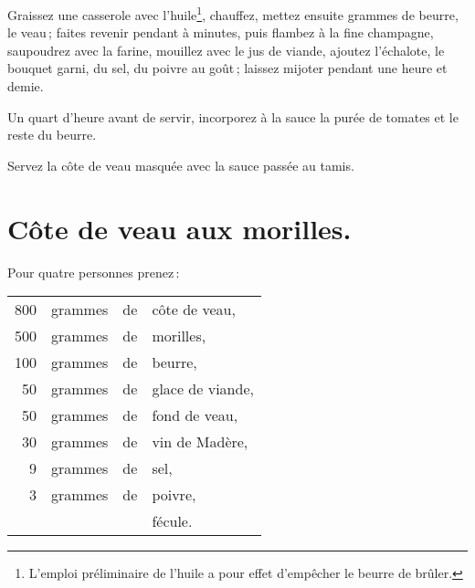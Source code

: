 Graissez une casserole avec l'huile\footnote{L'emploi préliminaire de l'huile
a pour effet d'empêcher le beurre de brûler.}, chauffez, mettez ensuite
{\mmm} grammes de beurre, le veau ; faites revenir pendant {\mmm}
à {\mmm} minutes, puis flambez à la fine champagne, saupoudrez avec la
farine, mouillez avec le jus de viande, ajoutez l'échalote, le bouquet garni,
du sel, du poivre au goût ; laissez mijoter pendant une heure et demie.

Un quart d'heure avant de servir, incorporez à la sauce la purée de tomates et
le reste du beurre.

Servez la côte de veau masquée avec la sauce passée au tamis.

\section*{\centering Côte de veau aux morilles.}
{}

Pour quatre personnes prenez :

\medskip

\footnotesize
\begin{longtable}{rrrp{16em}}
    800 & grammes & de & côte de veau,                                                                    \\
    500 & grammes & de & morilles,                                                                        \\
    100 & grammes & de & beurre,                                                                          \\
     50 & grammes & de & glace de viande,                                                                 \\
     50 & grammes & de & fond de veau,                                                                    \\
     30 & grammes & de & vin de Madère,                                                                   \\
      9 & grammes & de & sel,                                                                             \\
      3 & grammes & de & poivre,                                                                          \\
        &         &    & fécule.                                                                          \\
\end{longtable}
\normalsize

